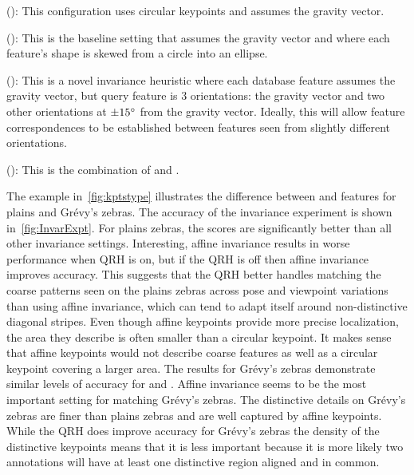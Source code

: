         \FloatBarrier{}
        \begin{itemln}

            \item \NoInvar{} (): %
                This configuration uses circular keypoints and assumes the gravity vector.

            \item \AIAlone{} (): %
                This is the baseline setting that assumes the gravity vector and where each feature's shape is skewed
                  from a circle into an ellipse.

            \item \QRHCirc{} (): %
                This is a novel invariance heuristic where each {database} feature assumes the gravity vector, but
                  {query} feature is $3$ orientations:
                the gravity vector and two other orientations at $\pm15^{\circ}$ from the gravity vector.
                Ideally, this will allow feature correspondences to be established between features seen from
                  slightly different orientations.

            \item \QRHEll{} (): %
                This is the combination of \QRHCirc{} and \AIAlone{}.

        \end{itemln}
        \FloatBarrier{}

        The example in~\cref{fig:kptstype} illustrates the difference between \AIAlone{} and \QRHCirc{} features
        for plains and Grévy's zebras. The accuracy of the invariance experiment is shown in~\cref{fig:InvarExpt}.
        For plains zebras, the \QRHCirc{} scores are significantly better than all other invariance settings.
        Interesting, affine invariance results in worse performance when QRH is on, but if the QRH is off then
        affine invariance improves accuracy. This suggests that the QRH better handles matching the coarse patterns
        seen on the plains zebras across pose and viewpoint variations than using affine invariance, which can tend
        to adapt itself around non-distinctive diagonal stripes. Even though affine keypoints provide more precise
        localization, the area they describe is often smaller than a circular keypoint. It makes sense that affine
        keypoints would not describe coarse features as well as a circular keypoint covering a larger area.
        The results for Grévy's zebras demonstrate similar levels of accuracy for \AIAlone{} and \QRHEll{}. Affine
        invariance seems to be the most important setting for matching Grévy's zebras. The distinctive details on
        Grévy's zebras are finer than plains zebras and are well captured by affine keypoints. While the QRH does
        improve accuracy for Grévy's zebras the density of the distinctive keypoints means that it is less
        important because it is more likely two annotations will have at least one distinctive region aligned and
        in common.

